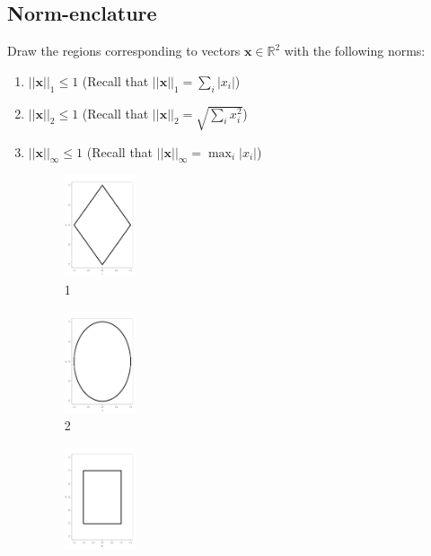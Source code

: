 \documentclass[a4paper]{article}
\theoremstyle{definition}
\newcommand{\RR}{\mathbb{R}}
\newenvironment{soln}{
    \leavevmode\color{blue}\ignorespaces
}{}
\begin{document}
\subsection{Norm-enclature}
Draw the regions corresponding to vectors $\mathbf{x}\in\RR^2$ with the following norms:
\begin{enumerate}
	\item 	$||\mathbf{x}||_1\leq 1$ (Recall that $||\mathbf{x}||_1 = \sum_i |x_i|$)
	\item 	$||\mathbf{x}||_2 \leq 1$ (Recall that $||\mathbf{x}||_2 =\sqrt{\sum_i x_i^2}$)
	\item 	$||\mathbf{x}||_\infty \leq 1$ (Recall that $||\mathbf{x}||_\infty = \max_i |x_i|$)
	
	\begin{soln}
	   
		\begin{figure}[h!]
	        		\centering
	   		\includegraphics[width=0.2\textwidth]{711.pdf}  
	   		\captionsetup{labelformat=empty}
	   		\caption{1}
	   	\end{figure}
		\begin{figure}[h!]
	        		\centering
	   		\includegraphics[width=0.2\textwidth]{712.pdf}  
	   		\captionsetup{labelformat=empty}
	   		\caption{2}
	   	\end{figure}
		\begin{figure}[h!]
	        		\centering
	   		\includegraphics[width=0.2\textwidth]{713.pdf}  

\end{figure}
\end{soln}
\end{enumerate}
\end{document}
